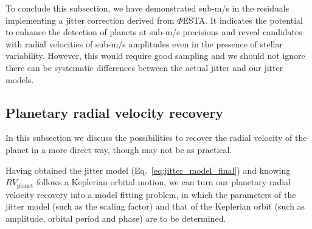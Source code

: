 To conclude this subsection, we have demonstrated sub-m/s in the residuals implementing a jitter correction derived from $\mathit{\Phi}$ESTA. It indicates the potential to enhance the detection of planets at sub-m/s precisions and reveal candidates with radial velocities of sub-m/s amplitudes even in the presence of stellar variability. However, this would require good sampling and we should not ignore there can be systematic differences between the actual jitter and our jitter models.

\subsection{Planetary radial velocity recovery}

In this subsection we discuss the possibilities to recover the radial velocity of the planet in a more direct way, though may not be as practical.

Having obtained the jitter model (Eq.~\ref{eq:jitter_model_final}) and knowing $RV_\text{planet}$ follows a Keplerian orbital motion, we can turn our planetary radial velocity recovery into a model fitting problem, in which the parameters of the jitter model (such as the scaling factor) and that of the Keplerian orbit (such as amplitude, orbital period and phase) are to be determined. 

